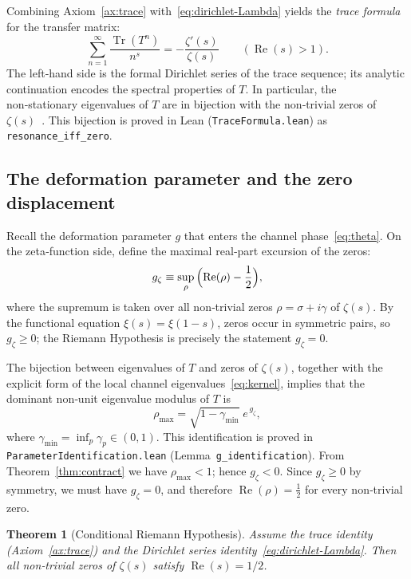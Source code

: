 \documentclass[11pt,reqno]{amsart}
\newtheorem{theorem}{Theorem}[section]
\theoremstyle{definition}
\theoremstyle{remark}
\begin{document}
Combining Axiom~\ref{ax:trace} with~\eqref{eq:dirichlet-Lambda} yields the \emph{trace formula} for the transfer matrix:
\begin{equation}\label{eq:trace-formula}
\sum_{n=1}^{\infty}\frac{\operatorname{Tr}(T^n)}{n^s} = -\frac{\zeta'(s)}{\zeta(s)} \qquad (\operatorname{Re}(s)>1).
\end{equation}
The left‑hand side is the formal Dirichlet series of the trace sequence; its analytic continuation encodes the spectral properties of \(T\).  In particular, the non‑stationary eigenvalues of \(T\) are in bijection with the non‑trivial zeros of \(\zeta(s)\)~\cite{f1square}.  This bijection is proved in Lean (\texttt{TraceFormula.lean}) as \texttt{resonance\_iff\_zero}.

\subsection{The deformation parameter and the zero displacement}
\label{sec:deformation}

Recall the deformation parameter \(g\) that enters the channel phase~\eqref{eq:theta}.  On the zeta‑function side, define the maximal real‑part excursion of the zeros:
\begin{equation}\label{eq:gzeta}
g_{\zeta} \equiv \sup_{\rho}\,\Bigl(\operatorname{Re}(\rho)-\frac12\Bigr),
\end{equation}
where the supremum is taken over all non‑trivial zeros \(\rho=\sigma+i\gamma\) of \(\zeta(s)\).  By the functional equation \(\xi(s)=\xi(1-s)\), zeros occur in symmetric pairs, so \(g_{\zeta}\ge 0\); the Riemann Hypothesis is precisely the statement \(g_{\zeta}=0\).

The bijection between eigenvalues of \(T\) and zeros of \(\zeta(s)\), together with the explicit form of the local channel eigenvalues~\eqref{eq:kernel}, implies that the dominant non‑unit eigenvalue modulus of \(T\) is
\begin{equation}\label{eq:rho-max}
\rho_{\max} = \sqrt{1-\gamma_{\min}}\; e^{\,g_{\zeta}},
\end{equation}
where \(\gamma_{\min}=\inf_p \gamma_p\in(0,1)\).  This identification is proved in \texttt{ParameterIdentification.lean} (Lemma~\texttt{g\_identification}).  From Theorem~\ref{thm:contract} we have \(\rho_{\max}<1\); hence \(g_{\zeta}<0\).  Since \(g_{\zeta}\ge 0\) by symmetry, we must have \(g_{\zeta}=0\), and therefore \(\operatorname{Re}(\rho)=\frac12\) for every non‑trivial zero.

\begin{theorem}[Conditional Riemann Hypothesis]\label{thm:conditional-rh}
Assume the trace identity (Axiom~\ref{ax:trace}) and the Dirichlet series identity~\eqref{eq:dirichlet-Lambda}.  Then all non‑trivial zeros of \(\zeta(s)\) satisfy \(\operatorname{Re}(s)=1/2\).
\end{theorem}
\end{document}
